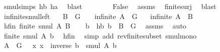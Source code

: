 \begin{isabellebody}
\ smul{\isachardot}{\kern0pt}simps\ hb\ ha\ \isamarkupfalse%
\ blast\isanewline
\ \ \isamarkupfalse%
\isanewline
\ \ \isamarkupfalse%
\ \isamarkupfalse%
\ False\ \isamarkupfalse%
\ assms\ \isamarkupfalse%
\ finite{\isacharunderscore}{\kern0pt}surj\ \isamarkupfalse%
\ blast\isanewline
{}\isamarkupfalse%
%
\endisatagproof
{\isafoldproof}%
%
\isadelimproof
\isanewline
%
\endisadelimproof
\isanewline
{}\isamarkupfalse%
\ infinite{\isacharunderscore}{\kern0pt}smul{\isacharunderscore}{\kern0pt}left{\isacharcolon}{\kern0pt}\isanewline
\ \ \ {\isachardoublequoteopen}B\ {\isasyminter}\ G\ {\isasymnoteq}\ {\isacharbraceleft}{\kern0pt}{\isacharbraceright}{\kern0pt}{\isachardoublequoteclose}\ \ {\isachardoublequoteopen}infinite\ {\isacharparenleft}{\kern0pt}A\ {\isasyminter}\ G{\isacharparenright}{\kern0pt}{\isachardoublequoteclose}\isanewline
\ \ \ {\isachardoublequoteopen}infinite\ {\isacharparenleft}{\kern0pt}A\ {\isasymcdots}\ B{\isacharparenright}{\kern0pt}{\isachardoublequoteclose}\isanewline
%
\isadelimproof
%
\endisadelimproof
%
\isatagproof
{}\isamarkupfalse%
\isanewline
\ \ \isamarkupfalse%
\ hfin{\isacharcolon}{\kern0pt}\ {\isachardoublequoteopen}finite\ {\isacharparenleft}{\kern0pt}smul\ A\ B{\isacharparenright}{\kern0pt}{\isachardoublequoteclose}\isanewline
\ \ \isamarkupfalse%
\ b\ \ hb{\isacharcolon}{\kern0pt}\ {\isachardoublequoteopen}b\ {\isasymin}\ B\ {\isasyminter}\ G{\isachardoublequoteclose}\ \isamarkupfalse%
\ assms\ \isamarkupfalse%
\ auto\isanewline
\ \ \isamarkupfalse%
\ \isamarkupfalse%
\ {\isachardoublequoteopen}finite\ {\isacharparenleft}{\kern0pt}smul\ A\ {\isacharbraceleft}{\kern0pt}b{\isacharbraceright}{\kern0pt}{\isacharparenright}{\kern0pt}{\isachardoublequoteclose}\ \isamarkupfalse%
\ hfin\ \isamarkupfalse%
\ {\isacharparenleft}{\kern0pt}simp\ add{\isacharcolon}{\kern0pt}\ rev{\isacharunderscore}{\kern0pt}finite{\isacharunderscore}{\kern0pt}subset\ smul{\isacharunderscore}{\kern0pt}mono{\isacharparenright}{\kern0pt}\isanewline
\ \ \isamarkupfalse%
\ \isamarkupfalse%
\ {\isachardoublequoteopen}A\ {\isasyminter}\ G\ {\isasymsubseteq}\ {\isacharparenleft}{\kern0pt}{\isasymlambda}\ x{\isachardot}{\kern0pt}\ x\ {\isasymcdot}\ inverse\ b{\isacharparenright}{\kern0pt}\ {\isacharbackquote}{\kern0pt}\ smul\ A\ {\isacharbraceleft}{\kern0pt}b{\isacharbraceright}{\kern0pt}{\isachardoublequoteclose}\isanewline

\end{isabellebody}
